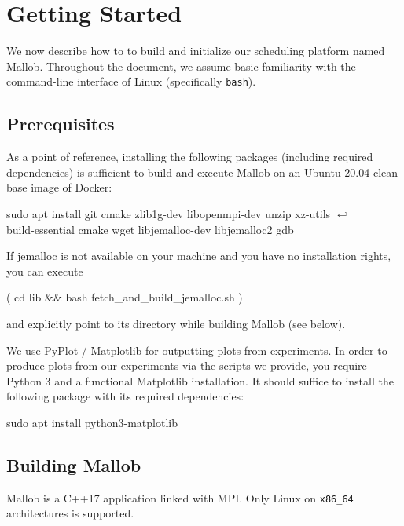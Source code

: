 \documentclass[runningheads]{article}
\newcommand{\CR}{{\tiny$\hookleftarrow$}}
\numberwithin{dummy}{subsection}
\begin{document}
\section{Getting Started}

We now describe how to to build and initialize our scheduling platform named Mallob.
Throughout the document, we assume basic familiarity with the command-line interface of Linux (specifically \texttt{bash}).

\subsection{Prerequisites}
\label{sec:prerequisites}

As a point of reference, installing the following packages (including required dependencies) is sufficient to build and execute Mallob on an Ubuntu 20.04 clean base image of Docker:

\begin{ttfenv}
sudo apt install git cmake zlib1g-dev libopenmpi-dev unzip xz-utils \CR\\
build-essential cmake wget libjemalloc-dev libjemalloc2 gdb
\end{ttfenv}

If jemalloc is not available on your machine and you have no installation rights, you can execute

\begin{ttfenv}
( cd lib \&\& bash fetch\_and\_build\_jemalloc.sh )
\end{ttfenv}

and explicitly point to its directory while building Mallob (see below).

We use PyPlot / Matplotlib for outputting plots from experiments.
In order to produce plots from our experiments via the scripts we provide, you require Python 3 and a functional Matplotlib installation.
It should suffice to install the following package with its required dependencies:

\begin{ttfenv}
sudo apt install python3-matplotlib
\end{ttfenv}



\subsection{Building Mallob}

Mallob is a C++17 application linked with MPI. Only Linux on \texttt{x86\_64} architectures is supported.
\end{document}
